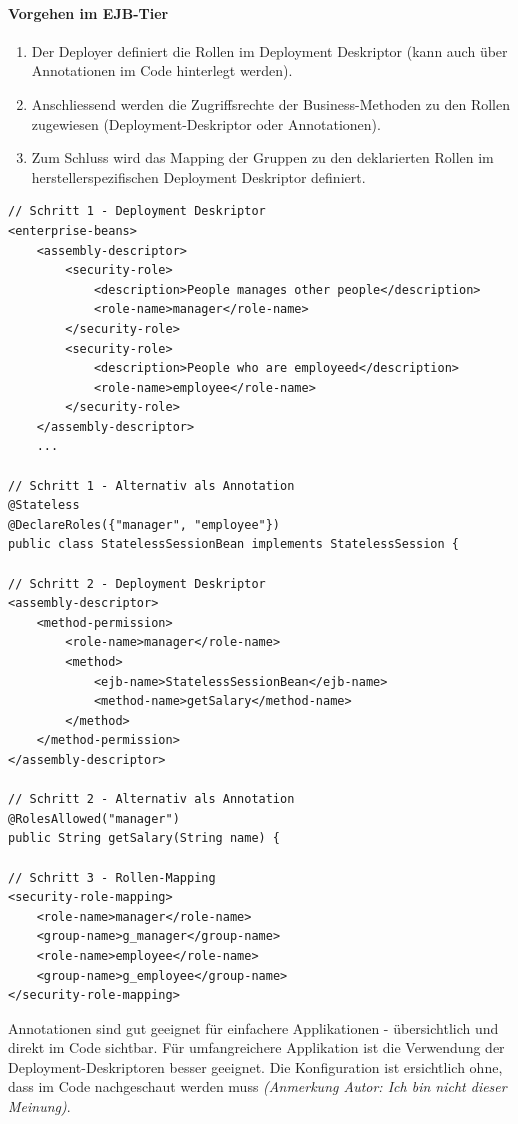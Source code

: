 \paragraph{Vorgehen im EJB-Tier}
\begin{enumerate}
	\item Der Deployer definiert die Rollen im Deployment Deskriptor (kann auch über Annotationen im Code hinterlegt werden).
	
	\item Anschliessend werden die Zugriffsrechte der Business-Methoden zu den Rollen zugewiesen (Deployment-Deskriptor oder Annotationen).
	
	\item Zum Schluss wird das Mapping der Gruppen zu den deklarierten Rollen im herstellerspezifischen Deployment Deskriptor definiert.
\end{enumerate}
  

\begin{lstlisting}
// Schritt 1 - Deployment Deskriptor
<enterprise-beans>
	<assembly-descriptor>
		<security-role>
			<description>People manages other people</description>
			<role-name>manager</role-name>
		</security-role>
		<security-role>
			<description>People who are employeed</description>
			<role-name>employee</role-name>
		</security-role>
	</assembly-descriptor>
	...

// Schritt 1 - Alternativ als Annotation
@Stateless
@DeclareRoles({"manager", "employee"})
public class StatelessSessionBean implements StatelessSession {

// Schritt 2 - Deployment Deskriptor
<assembly-descriptor>
	<method-permission>
		<role-name>manager</role-name>
		<method>
			<ejb-name>StatelessSessionBean</ejb-name>
			<method-name>getSalary</method-name>
		</method>
	</method-permission>
</assembly-descriptor>

// Schritt 2 - Alternativ als Annotation
@RolesAllowed("manager")
public String getSalary(String name) {

// Schritt 3 - Rollen-Mapping
<security-role-mapping>
	<role-name>manager</role-name>
	<group-name>g_manager</group-name>
	<role-name>employee</role-name>
	<group-name>g_employee</group-name>
</security-role-mapping>
\end{lstlisting}

Annotationen sind gut geeignet für einfachere Applikationen - übersichtlich und direkt im Code sichtbar. Für umfangreichere Applikation ist die Verwendung der Deployment-Deskriptoren besser geeignet. Die Konfiguration ist ersichtlich ohne, dass im Code nachgeschaut werden muss \emph{(Anmerkung Autor: Ich bin nicht dieser Meinung)}.

